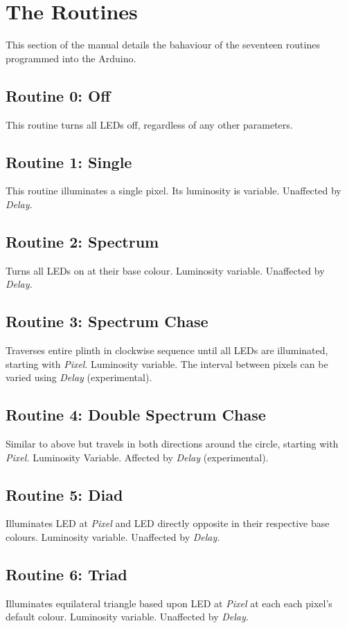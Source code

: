 \documentclass{article}
\begin{document}
	\section{The Routines}
	This section of the manual details the bahaviour of the seventeen routines 
	programmed into the Arduino.

	\subsection{Routine 0: Off}
	This routine turns all LEDs off, regardless of any other parameters.

	\subsection{Routine 1: Single}
	This routine illuminates a single pixel. Its luminosity is variable. 
	Unaffected by \emph{Delay.}

	\subsection{Routine 2: Spectrum}
	Turns all LEDs on at their base colour. Luminosity variable. Unaffected by 
	\emph{Delay.}

	\subsection{Routine 3: Spectrum Chase}
	Traverses entire plinth in clockwise sequence until all LEDs are 
	illuminated, starting with \emph{Pixel}. Luminosity variable. The interval 
	between pixels can be varied using \emph{Delay} (experimental).

	\subsection{Routine 4: Double Spectrum Chase}
	Similar to above but travels in both directions around the circle, starting 
	with \emph{Pixel.} Luminosity Variable. Affected by \emph{Delay} 
	(experimental).

	\subsection{Routine 5: Diad}
	Illuminates LED at \emph{Pixel} and LED directly opposite in their 
	respective base colours. Luminosity variable. Unaffected by \emph{Delay.}

	\subsection{Routine 6: Triad}
	Illuminates equilateral triangle based upon LED at \emph{Pixel} at each 
	each pixel's default colour. Luminosity variable. Unaffected by 
	\emph{Delay.}
\end{document}
